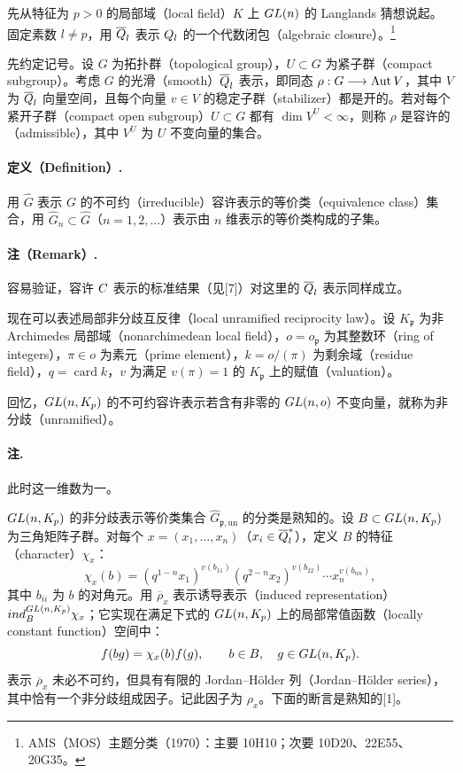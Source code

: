 
先从特征为 $p>0$ 的局部域（local field）$K$ 上 $GL(n)$ 的 Langlands 猜想说起。固定素数 $l\ne p$，用 $\overline{Q}_l$ 表示 $Q_l$ 的一个代数闭包（algebraic closure）。\footnote{AMS（MOS）主题分类（1970）：主要 10H10；次要 10D20、22E55、20G35。}

先约定记号。设 $G$ 为拓扑群（topological group），$U\subset G$ 为紧子群（compact subgroup）。考虑 $G$ 的光滑（smooth）$\overline{Q}_l$ 表示，即同态 $\rho:G\longrightarrow\Aut V$，其中 $V$ 为 $\overline{Q}_l$ 向量空间，且每个向量 $v\in V$ 的稳定子群（stabilizer）都是开的。若对每个紧开子群（compact open subgroup）$U\subset G$ 都有 $\dim V^U<\infty$，则称 $\rho$ 是容许的（admissible），其中 $V^U$ 为 $U$ 不变向量的集合。

\paragraph*{定义（Definition）.}
用 $\widehat G$ 表示 $G$ 的不可约（irreducible）容许表示的等价类（equivalence class）集合，用 $\widehat G_n\subset\widehat G$（$n=1,2,\ldots$）表示由 $n$ 维表示的等价类构成的子集。

\paragraph*{注（Remark）.}
容易验证，容许 $C$ 表示的标准结果（见[7]）对这里的 $\overline{Q}_l$ 表示同样成立。

现在可以表述局部非分歧互反律（local unramified reciprocity law）。设 $K_{\mathfrak p}$ 为非 Archimedes 局部域（nonarchimedean local field），$o=o_{\mathfrak p}$ 为其整数环（ring of integers），$\pi\in o$ 为素元（prime element），$k=o/(\pi)$ 为剩余域（residue field），$q=\operatorname{card}k$，$v$ 为满足 $v(\pi)=1$ 的 $K_{\mathfrak p}$ 上的赋值（valuation）。

回忆，$GL(n,K_{p})$ 的不可约容许表示若含有非零的 $GL(n,o)$ 不变向量，就称为非分歧（unramified）。

\paragraph*{注.} 此时这一维数为一。

$GL(n,K_{p})$ 的非分歧表示等价类集合 $\widehat G_{\mathfrak p,\mathrm{un}}$ 的分类是熟知的。设 $B\subset GL(n,K_{p})$ 为三角矩阵子群。对每个 $x=(x_1,\ldots,x_n)$（$x_i\in\overline{Q}_l^*$），定义 $B$ 的特征（character）$\chi_x$：
\[
 \chi_x(b)=(q^{1-n}x_1)^{v(b_{11})}(q^{2-n}x_2)^{v(b_{22})}\cdots x_n^{v(b_{nn})},
\]
其中 $b_{ii}$ 为 $b$ 的对角元。用 $\overline\rho_x$ 表示诱导表示（induced representation）$ind_B^{GL(n,K_{p})}\chi_x$；它实现在满足下式的 $GL(n,K_{p})$ 上的局部常值函数（locally constant function）空间中：
\[
 f(bg)=\chi_x(b)f(g),\qquad b\in B,\quad g\in GL(n,K_{p}).
\]
表示 $\overline\rho_x$ 未必不可约，但具有有限的 Jordan--Hölder 列（Jordan--Hölder series），其中恰有一个非分歧组成因子。记此因子为 $\rho_x$。下面的断言是熟知的[1]。

